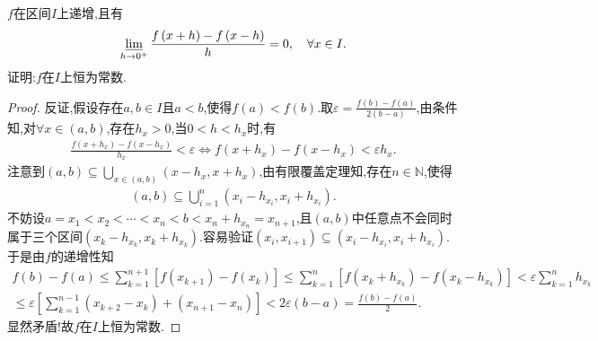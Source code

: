 \documentclass[../../main.tex]{subfiles}%
\begin{document}
\begin{proposition}\label{proposition:递增函数Schwarz导下极限为0必为常函数}
$f$在区间$I$上递增,且有
\begin{align*}
\varliminf\limits_{h\rightarrow 0^+}\frac{f\left( x+h \right) -f\left( x-h \right)}{h}=0,\quad \forall x\in I.
\end{align*}
证明:$f$在$I$上恒为常数.
\end{proposition}
\begin{proof}

反证,假设存在$a,b\in I$且$a<b$,使得$f\left( a \right) <f\left( b \right)$.取$\varepsilon =\frac{f\left( b \right) -f\left( a \right)}{2\left( b-a \right)}$,由条件知,对$\forall x\in \left( a,b \right)$,存在$h_x>0$,当$0<h<h_x$时,有
\begin{align*}
\frac{f\left( x+h_x \right) -f\left( x-h_x \right)}{h_x}<\varepsilon \Longleftrightarrow f\left( x+h_x \right) -f\left( x-h_x  \right) <\varepsilon h_x.
\end{align*}
注意到$\left( a,b \right) \subseteq \bigcup\limits_{x\in \left( a,b \right)}{\left( x-h_x ,x+h_x \right)}$,由有限覆盖定理知,存在$n\in \mathbb{N}$,使得
\begin{align*}
\left( a,b \right) \subseteq \bigcup\limits_{i=1}^n{\left( x_i-h_{x_i} ,x_i+h_{x_i} \right)}.
\end{align*}
不妨设$a=x_1<x_2<\cdots <x_n<b<x_n+h_{x_n}=x_{n+1}$,且$\left( a,b \right)$中任意点不会同时属于三个区间$\left( x_k-h_{x_k},x_k+h_{x_k} \right)$.容易验证$\left( x_i,x_{i+1} \right) \subseteq \left( x_i-h_{x_i},x_i+h_{x_i} \right)$.于是由$f$的递增性知
\begin{align*}
f\left( b \right) -f\left( a \right) \leqslant \sum\limits_{k=1}^{n+1}{\left[ f\left( x_{k+1} \right) -f\left( x_k \right) \right]}\leqslant \sum\limits_{k=1}^n{\left[ f\left( x_k+h_{x_k} \right) -f\left( x_k-h_{x_k} \right) \right]}<\varepsilon \sum\limits_{k=1}^n{h_{x_k}}\\
\leqslant \varepsilon \left[ \sum\limits_{k=1}^{n-1}{\left( x_{k+2}-x_k \right)}+\left( x_{n+1}-x_n \right) \right] <2\varepsilon \left( b-a \right) =\frac{f\left( b \right) -f\left( a \right)}{2}.
\end{align*}
显然矛盾!故$f$在$I$上恒为常数.

\end{proof}
\end{document}
